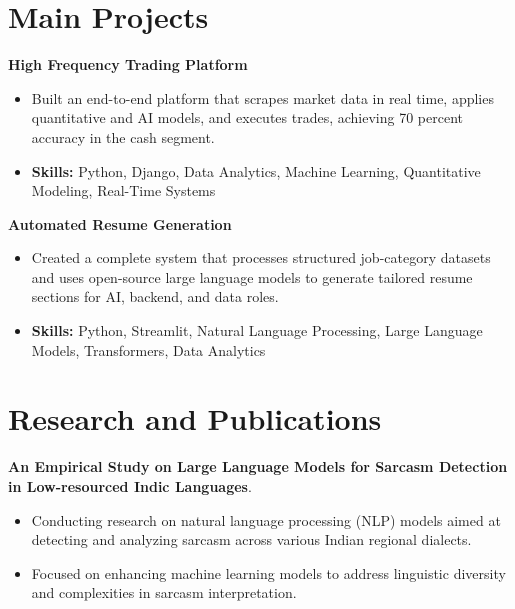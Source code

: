 \documentclass[a4paper,11pt]{article}
\begin{document}
\section{\textbf{Main Projects}}

\vspace{1mm}
  \textbf{High Frequency Trading Platform  }
\vspace{-1.5mm} %
\begin{itemize}
  \item Built an end-to-end platform that scrapes market data in real time, applies quantitative and AI models, and executes trades, achieving 70 percent accuracy in the cash segment.
\vspace{-3mm}
  \item \textbf{Skills:} Python, Django, Data Analytics, Machine Learning, Quantitative Modeling, Real-Time Systems
\end{itemize}


\vspace{1mm}
   \textbf{Automated Resume Generation }
\vspace{-1.5mm} %
\begin{itemize}
  \item Created a complete system that processes structured job-category datasets and uses open-source large language models to generate tailored resume sections for AI, backend, and data roles.
\vspace{-3mm}
  \item \textbf{Skills:} Python, Streamlit, Natural Language Processing, Large Language Models, Transformers, Data Analytics
\end{itemize}



\section{\textbf{Research and Publications} \hfill }
\vspace{1mm}
  \textbf{An Empirical Study on Large Language Models for Sarcasm Detection in Low-resourced Indic Languages}.
\vspace{-1mm} %
\begin{itemize}
  \item Conducting research on natural language processing (NLP) models aimed at detecting and analyzing sarcasm across various Indian regional dialects.
\vspace{-3mm}
  \item Focused on enhancing machine learning models to address linguistic diversity and complexities in sarcasm interpretation.
\end{itemize}
\end{document}
